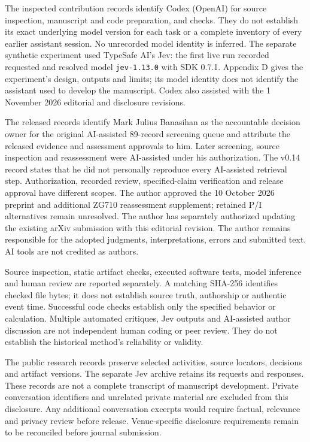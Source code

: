 \documentclass[11pt]{article}
\begin{document}
The inspected contribution records identify Codex (OpenAI) for source inspection, manuscript and code preparation, and checks. They do not establish its exact underlying model version for each task or a complete inventory of every earlier assistant session. No unrecorded model identity is inferred. The separate synthetic experiment used TypeSafe AI's Jev: the first live run recorded requested and resolved model \texttt{jev-1.13.0} with SDK 0.7.1. Appendix D gives the experiment's design, outputs and limits; its model identity does not identify the assistant used to develop the manuscript. Codex also assisted with the 1 November 2026 editorial and disclosure revisions.

The released records identify Mark Julius Banasihan as the accountable decision owner for the original AI-assisted 89-record screening queue and attribute the released evidence and assessment approvals to him. Later screening, source inspection and reassessment were AI-assisted under his authorization. The v0.14 record states that he did not personally reproduce every AI-assisted retrieval step. Authorization, recorded review, specified-claim verification and release approval have different scopes. The author approved the 10 October 2026 preprint and additional ZG710 reassessment supplement; retained P/I alternatives remain unresolved. The author has separately authorized updating the existing arXiv submission with this editorial revision. The author remains responsible for the adopted judgments, interpretations, errors and submitted text. AI tools are not credited as authors.

Source inspection, static artifact checks, executed software tests, model inference and human review are reported separately. A matching SHA-256 identifies checked file bytes; it does not establish source truth, authorship or authentic event time. Successful code checks establish only the specified behavior or calculation. Multiple automated critiques, Jev outputs and AI-assisted author discussion are not independent human coding or peer review. They do not establish the historical method's reliability or validity.

The public research records preserve selected activities, source locators, decisions and artifact versions. The separate Jev archive retains its requests and responses. These records are not a complete transcript of manuscript development. Private conversation identifiers and unrelated private material are excluded from this disclosure. Any additional conversation excerpts would require factual, relevance and privacy review before release. Venue-specific disclosure requirements remain to be reconciled before journal submission.
\end{document}
